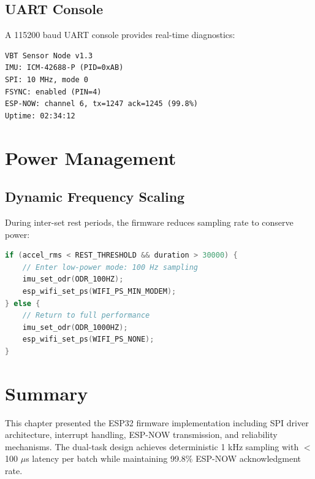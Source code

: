 \subsection{UART Console}

A 115200 baud UART console provides real-time diagnostics:

\begin{verbatim}
VBT Sensor Node v1.3
IMU: ICM-42688-P (PID=0xAB)
SPI: 10 MHz, mode 0
FSYNC: enabled (PIN=4)
ESP-NOW: channel 6, tx=1247 ack=1245 (99.8%)
Uptime: 02:34:12
\end{verbatim}

\section{Power Management}

\subsection{Dynamic Frequency Scaling}

During inter-set rest periods, the firmware reduces sampling rate to conserve power:

\begin{lstlisting}[language=c]
if (accel_rms < REST_THRESHOLD && duration > 30000) {
    // Enter low-power mode: 100 Hz sampling
    imu_set_odr(ODR_100HZ);
    esp_wifi_set_ps(WIFI_PS_MIN_MODEM);
} else {
    // Return to full performance
    imu_set_odr(ODR_1000HZ);
    esp_wifi_set_ps(WIFI_PS_NONE);
}
\end{lstlisting}

\section{Summary}

This chapter presented the ESP32 firmware implementation including SPI driver architecture, interrupt handling, ESP-NOW transmission, and reliability mechanisms. The dual-task design achieves deterministic 1 kHz sampling with $<$100 $\mu$s latency per batch while maintaining 99.8\% ESP-NOW acknowledgment rate.

\newpage